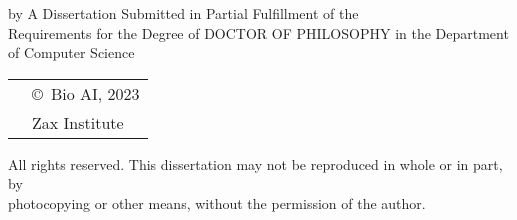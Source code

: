 \pagebreak
{
\centering
\thesistitle
\tpbreak
by
\tpbreak
\nameanddegrees
\tpbreak
A Dissertation Submitted in Partial Fulfillment of the \\
Requirements for the Degree of
\tpbreak
DOCTOR OF PHILOSOPHY
\tpbreak
in the Department of Computer Science\\
\vfill
\begin{tabular}{cl}
& \copyright\ Bio AI, 2023\\
& \phantom{\copyright} Zax Institute
\end{tabular}
\tpbreak
All rights reserved. This dissertation may not be reproduced in whole or in part, by \\
\hfill photocopying or other means, without the permission of the author. 
\hfill
}
\pagebreak
